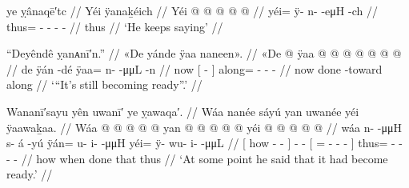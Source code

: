 \ex\label{ex:100-112-he-said}%
%
\begingl
	\glpreamble	ye ỵânaqē′tc //
	\glpreamble	Yéi ÿanaḵéich //
	\gla	Yéi @  @ {} @ {} @ {} @ {} //
	\glb	yéi= ÿ- n-  -eμH -ch //
	\glc	thus= - -  - - //
	\gld	thus  {} {} {} {} //
	\glft	‘He keeps saying’
		//
\endgl
\xe

\ex\label{ex:100-113-getting-toward-done}%
%
\begingl
	\glpreamble	“Deyêndê ỵanᴀnī′n.” //
	\glpreamble	«\!De yánde ÿaa naneen\!». //
	\gla	«\!De 
		{}  @ {} {} 
		ÿaa @  @ {} @ {} @ {} @ {} @ {} @ {} //
	\glb	\pqp{}de
		{} ÿán -dé {} 
		ÿaa= n-  -μμL -n //
	\glc	\pqp{}now
		{}[  - {}]
		along= -  - - //
	\gld	\pqp{}now
		{} done -toward {}
		along  {} {} {} {} {} {} //
	\glft	‘“It’s still becoming ready”.’
		//
\endgl
\xe

\ex\label{ex:100-114-at-some-point-ready}%
%
\begingl
	\glpreamble	Wananī′sayu yên uwanī′ ye ỵawaqa′. //
	\glpreamble	Wáa nanée sáyú yan uwanée yéi ÿaawaḵaa. //
	\gla	{} Wáa  @ {} @ {} @ {} {}  @ {} @ {}
		{} yan @  @ {} @ {} @ {} @ {} {} 
		yéi @  @ {} @ {} @ {} @ {}//
	\glb	{} wáa n-  -μμH {} {} s- á -yú
		{} ÿán= u- i-  -μμH {} {}
		yéi= ÿ- wu- i-  -μμL //
	\glc	{}[ how -  - \· {}] -  -
		{}[ = - -  - \· {}]
		thus= - - -  - //
	\gld	{} how  {} {} \·when {} {}  {}
		{} done  {} {} {} \·that {}
		thus  {} {} {} {} //
	\glft	‘At some point he said that it had become ready.’
		//
\endgl
\xe

